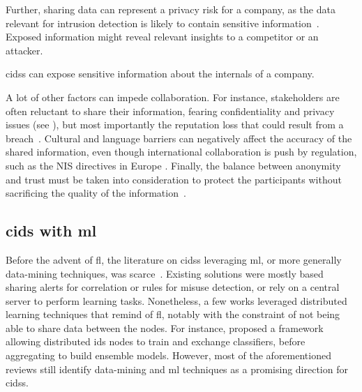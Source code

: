 Further, sharing data can represent a privacy risk for a company, as the data relevant for intrusion detection is likely to contain sensitive information~\cite{zhou_surveycoordinatedattacks_2010}.
Exposed information might reveal relevant insights to a competitor or an attacker.


\begin{challenge}
  \Glspl{cids} can expose sensitive information about the internals of a company.
  \label{chall:privacy}
\end{challenge}

A lot of other factors can impede collaboration.
For instance, stakeholders are often reluctant to share their information, fearing confidentiality and privacy issues (see ), but most importantly the reputation loss that could result from a breach~\cite{pala_InformationSharingCybersecurity_2019}.
Cultural and language barriers can negatively affect the accuracy of the shared information, even though international collaboration is push by regulation, such as the NIS directives in Europe \cite{NIS_directive,NIS2}.
Finally, the balance between anonymity and trust must be taken into consideration to protect the participants without sacrificing the quality of the information~\cite{murdoch_AnonymityvsTrust_2015}.


\subsection{\Gls{cids} with \acrlong{ml}\label{sec:bg.collab.ml}}

Before the advent of \gls{fl}, the literature on \glspl{cids} leveraging \gls{ml}, or more generally data-mining techniques, was scarce~\cite{folino_Ensemblebasedcollaborative_2016}.
Existing solutions were mostly based sharing alerts for correlation or rules for misuse detection, or rely on a central server to perform learning tasks.
Nonetheless, a few works leveraged distributed learning techniques that remind of \gls{fl}, notably with the constraint of not being able to share data between the nodes.
For instance, \textcite{folino_ensemblebasedevolutionaryframework_2010} proposed a framework allowing distributed \gls{ids} nodes to train and exchange classifiers, before aggregating to build ensemble models.
However, most of the aforementioned reviews still identify data-mining and \gls{ml} techniques as a promising direction for \glspl{cids}.
